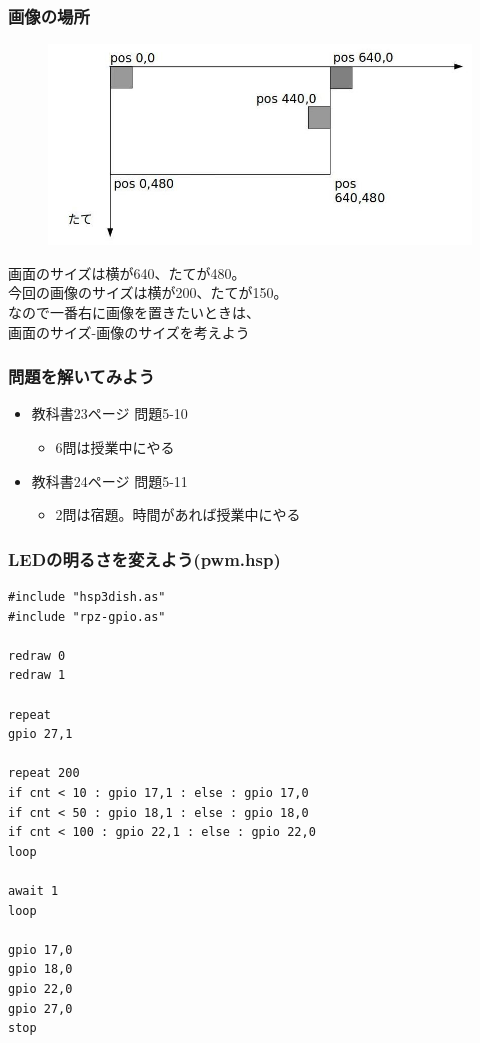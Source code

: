 \begin{frame}[fragile]
    \frametitle{画像の場所}
    \begin{center}
        \begin{figure}
            \includegraphics[width=\textwidth]{images/slide/volume_position.jpg}
        \end{figure}
        {画面のサイズは横が640、たてが480。\\
        今回の画像のサイズは横が200、たてが150。\\
        なので一番右に画像を置きたいときは、\\
        画面のサイズ-画像のサイズを考えよう}
    \end{center}
\end{frame}

\begin{frame}[fragile]
    \frametitle{問題を解いてみよう}
    \begin{itemize}
        \item 教科書23ページ 問題5-10
        \begin{itemize}
            \item 6問は授業中にやる
        \end{itemize}
        \item 教科書24ページ 問題5-11
        \begin{itemize}
            \item 2問は宿題。時間があれば授業中にやる
        \end{itemize}
    \end{itemize}
\end{frame}

\begin{frame}[fragile]
    \frametitle{LEDの明るさを変えよう(pwm.hsp)}
\begin{lstlisting}
#include "hsp3dish.as"
#include "rpz-gpio.as"

redraw 0
redraw 1

repeat
gpio 27,1

repeat 200
if cnt < 10 : gpio 17,1 : else : gpio 17,0
if cnt < 50 : gpio 18,1 : else : gpio 18,0
if cnt < 100 : gpio 22,1 : else : gpio 22,0
loop

await 1
loop

gpio 17,0
gpio 18,0
gpio 22,0
gpio 27,0
stop
\end{lstlisting}
\end{frame}

